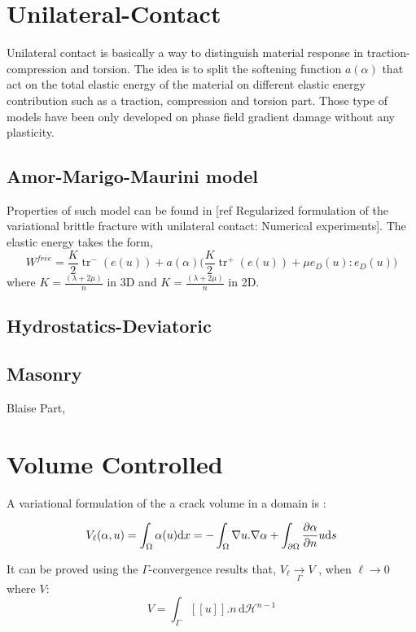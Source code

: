 \documentclass[10pt,oneside]{memoir}
\let\div\relax
\DeclareMathOperator*{\div}{div}
\DeclareMathOperator{\tr}{tr}
\newcommand{\jump}[1]{\ensuremath{[\![#1]\!]} }
\begin{document}
\section{Unilateral-Contact}

Unilateral contact is basically a way to distinguish material response in traction-compression and torsion. The idea is to split the softening function $a(\alpha)$ that act on the total elastic energy of the material on different elastic energy contribution such as a traction, compression and torsion part. Those type of models have been only developed on phase field gradient damage without any plasticity.

\subsection{Amor-Marigo-Maurini model}

Properties of such model can be found in [ref Regularized formulation of the variational brittle fracture with unilateral contact: Numerical experiments].
The elastic energy takes the form,
$$W^{free}= \frac{K}{2} \tr^-({e(u)}) + a(\alpha) \Big( \frac{K}{2}\tr ^+({e(u)}) + \mu e_D(u):e_D(u) \Big) $$ where $K=\frac{(\lambda+2\mu)}{n}$ in 3D and $K=\frac{(\lambda+2\mu)}{n}$ in 2D.

\subsection{Hydrostatics-Deviatoric}



\subsection{Masonry}

Blaise Part,




\section{Volume Controlled}


A variational formulation of the a crack volume in a domain is :

$$ V_{\ell}(\alpha,u)=\int_{\Omega} \alpha \div{(u)} \mathrm{d}x= - \int_{\Omega} \nabla u . \nabla \alpha + \int_{\partial \Omega} \frac{\partial \alpha}{\partial n} u \mathrm{d}s$$

It can be proved using the $\Gamma$-convergence results that,
$V_{\ell} \underset{\Gamma}{\longrightarrow} V$ , when $\ell \rightarrow 0$ where $V$:
$$ V = \int_{\Gamma} \jump{u} .n\, \mathrm{d}\mathcal{H}^{n-1}$$
\end{document}
